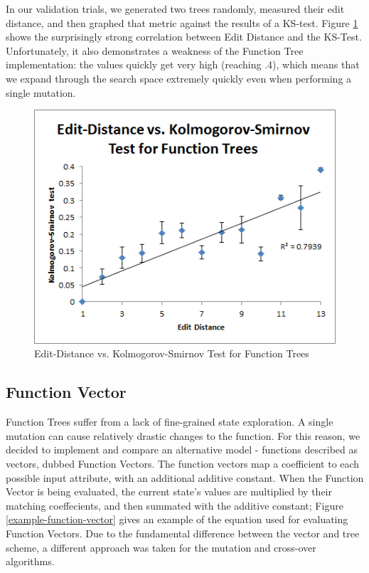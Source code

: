 \documentclass{acm_proc_article-sp}
\begin{document}
In our validation trials, we generated two trees randomly, measured their edit distance, and then graphed that metric against the results of a KS-test. Figure \ref{edit distance to ks-test for trees} shows the surprisingly strong correlation between Edit Distance and the KS-Test. Unfortunately, it also demonstrates a weakness of the Function Tree implementation: the values quickly get very high (reaching .4), which means that we expand through the search space extremely quickly even when performing a single mutation.

    \begin{figure}[h]
        \centering
        \includegraphics[width=\columnwidth]{./images/edit_distance_vs_ks-test.png}
        \caption{Edit-Distance vs. Kolmogorov-Smirnov Test for Function Trees}
        \label{edit distance to ks-test for trees}
    \end{figure}

	\subsection{Function Vector}
    
Function Trees suffer from a lack of fine-grained state exploration. A single mutation can cause relatively drastic changes to the function. For this reason, we decided to implement and compare an alternative model - functions described as vectors, dubbed Function Vectors. The function vectors map a coefficient to each possible input attribute, with an additional additive constant. When the Function Vector is being evaluated, the current state's values are multiplied by their matching coeffecients, and then summated with the additive constant; Figure \ref{example-function-vector} gives an example of the equation used for evaluating Function Vectors. Due to the fundamental difference between the vector and tree scheme, a different approach was taken for the mutation and cross-over algorithms. 
\end{document}
